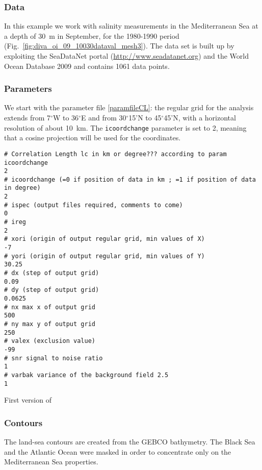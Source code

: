 \subsubsection{Data}

In this example we work with salinity measurements in the Mediterranean Sea at a depth of 30~m in September, for the 1980-1990 period (Fig.~\ref{fig:diva_oi_09_10030dataval_mesh3}). The data set is built up by exploiting the SeaDataNet portal (\url{http://www.seadatanet.org}) and the World Ocean Database 2009 \citep[WOD09,][]{BOYER09} and contains 1061 data points. 

\subsubsection{Parameters}

We start with the parameter file \ref{paramfileCL}: the regular grid for the analysis extends from 7$^{\circ}$W to 36$^{\circ}$E and from 30$^{\circ}$15'N to 45$^{\circ}$45'N, with a horizontal resolution of about 10~km. The \texttt{icoordchange} parameter is set to 2, meaning that a cosine projection will be used for the coordinates.

\begin{exfile}[htpb]
\begin{footnotesize}
\begin{verbatim}
# Correlation Length lc in km or degree??? according to param icoordchange
2
# icoordchange (=0 if position of data in km ; =1 if position of data in degree)
2
# ispec (output files required, comments to come)
0
# ireg
2
# xori (origin of output regular grid, min values of X)
-7
# yori (origin of output regular grid, min values of Y)
30.25
# dx (step of output grid)
0.09
# dy (step of output grid)
0.0625
# nx max x of output grid
500
# ny max y of output grid
250
# valex (exclusion value)
-99
# snr signal to noise ratio
1
# varbak variance of the background field 2.5
1
\end{verbatim}
\end{footnotesize}
\caption{First version of \label{paramfileCL}}
\end{exfile}

\subsubsection{Contours}

The land-sea contours are created from the GEBCO bathymetry. The Black Sea and the Atlantic Ocean were masked in order to concentrate only on the Mediterranean Sea properties. 

